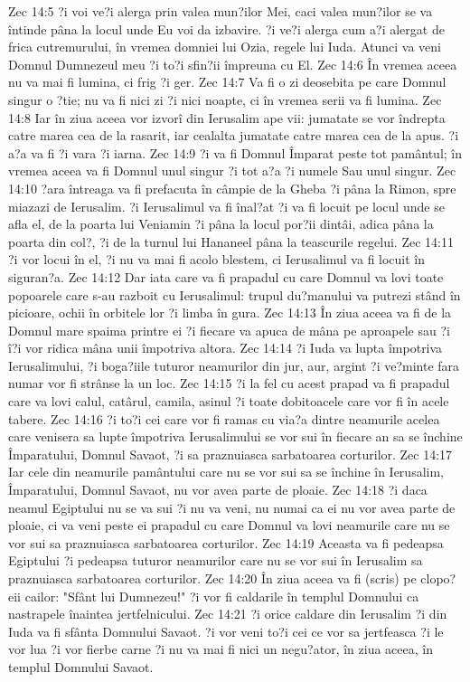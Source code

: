 Zec 14:5  ?i voi ve?i alerga prin valea mun?ilor Mei, caci valea mun?ilor se va întinde pâna la locul unde Eu voi da izbavire. ?i ve?i alerga cum a?i alergat de frica cutremurului, în vremea domniei lui Ozia, regele lui Iuda. Atunci va veni Domnul Dumnezeul meu ?i to?i sfin?ii împreuna cu El.
Zec 14:6  În vremea aceea nu va mai fi lumina, ci frig ?i ger.
Zec 14:7  Va fi o zi deosebita pe care Domnul singur o ?tie; nu va fi nici zi ?i nici noapte, ci în vremea serii va fi lumina.
Zec 14:8  Iar în ziua aceea vor izvorî din Ierusalim ape vii: jumatate se vor îndrepta catre marea cea de la rasarit, iar cealalta jumatate catre marea cea de la apus. ?i a?a va fi ?i vara ?i iarna.
Zec 14:9  ?i va fi Domnul Împarat peste tot pamântul; în vremea aceea va fi Domnul unul singur ?i tot a?a ?i numele Sau unul singur.
Zec 14:10  ?ara întreaga va fi prefacuta în câmpie de la Gheba ?i pâna la Rimon, spre miazazi de Ierusalim. ?i Ierusalimul va fi înal?at ?i va fi locuit pe locul unde se afla el, de la poarta lui Veniamin ?i pâna la locul por?ii dintâi, adica pâna la poarta din col?, ?i de la turnul lui Hananeel pâna la teascurile regelui.
Zec 14:11  ?i vor locui în el, ?i nu va mai fi acolo blestem, ci Ierusalimul va fi locuit în siguran?a.
Zec 14:12  Dar iata care va fi prapadul cu care Domnul va lovi toate popoarele care s-au razboit cu Ierusalimul: trupul du?manului va putrezi stând în picioare, ochii în orbitele lor ?i limba în gura.
Zec 14:13  În ziua aceea va fi de la Domnul mare spaima printre ei ?i fiecare va apuca de mâna pe aproapele sau ?i î?i vor ridica mâna unii împotriva altora.
Zec 14:14  ?i Iuda va lupta împotriva Ierusalimului, ?i boga?iile tuturor neamurilor din jur, aur, argint ?i ve?minte fara numar vor fi strânse la un loc.
Zec 14:15  ?i la fel cu acest prapad va fi prapadul care va lovi calul, catârul, camila, asinul ?i toate dobitoacele care vor fi în acele tabere.
Zec 14:16  ?i to?i cei care vor fi ramas cu via?a dintre neamurile acelea care venisera sa lupte împotriva Ierusalimului se vor sui în fiecare an sa se închine Împaratului, Domnul Savaot, ?i sa praznuiasca sarbatoarea corturilor.
Zec 14:17  Iar cele din neamurile pamântului care nu se vor sui sa se închine în Ierusalim, Împaratului, Domnul Savaot, nu vor avea parte de ploaie.
Zec 14:18  ?i daca neamul Egiptului nu se va sui ?i nu va veni, nu numai ca ei nu vor avea parte de ploaie, ci va veni peste ei prapadul cu care Domnul va lovi neamurile care nu se vor sui sa praznuiasca sarbatoarea corturilor.
Zec 14:19  Aceasta va fi pedeapsa Egiptului ?i pedeapsa tuturor neamurilor care nu se vor sui în Ierusalim sa praznuiasca sarbatoarea corturilor.
Zec 14:20  În ziua aceea va fi (scris) pe clopo?eii cailor: "Sfânt lui Dumnezeu!" ?i vor fi caldarile în templul Domnului ca nastrapele înaintea jertfelnicului.
Zec 14:21  ?i orice caldare din Ierusalim ?i din Iuda va fi sfânta Domnului Savaot. ?i vor veni to?i cei ce vor sa jertfeasca ?i le vor lua ?i vor fierbe carne ?i nu va mai fi nici un negu?ator, în ziua aceea, în templul Domnului Savaot.


